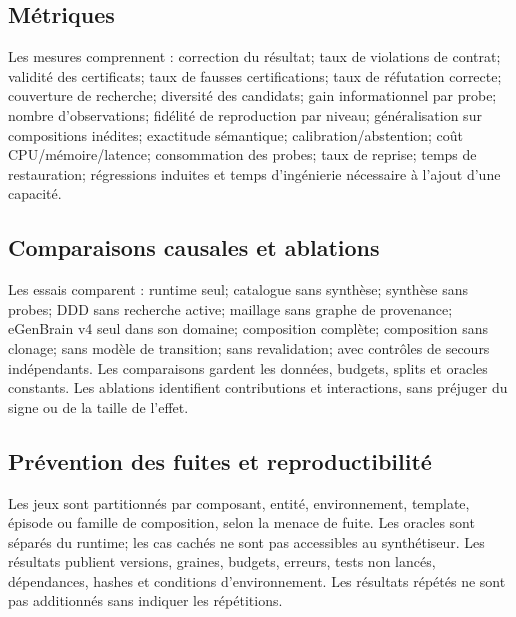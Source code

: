 \documentclass[11pt,a4paper]{article}
\begin{document}
\subsection{Métriques}
Les mesures comprennent : correction du résultat; taux de violations de contrat; validité des certificats; taux de fausses certifications; taux de réfutation correcte; couverture de recherche; diversité des candidats; gain informationnel par probe; nombre d'observations; fidélité de reproduction par niveau; généralisation sur compositions inédites; exactitude sémantique; calibration/abstention; coût CPU/mémoire/latence; consommation des probes; taux de reprise; temps de restauration; régressions induites et temps d'ingénierie nécessaire à l'ajout d'une capacité.

\subsection{Comparaisons causales et ablations}
Les essais comparent : runtime seul; catalogue sans synthèse; synthèse sans probes; DDD sans recherche active; maillage sans graphe de provenance; eGenBrain v4 seul dans son domaine; composition complète; composition sans clonage; sans modèle de transition; sans revalidation; avec contrôles de secours indépendants. Les comparaisons gardent les données, budgets, splits et oracles constants. Les ablations identifient contributions et interactions, sans préjuger du signe ou de la taille de l'effet.

\subsection{Prévention des fuites et reproductibilité}
Les jeux sont partitionnés par composant, entité, environnement, template, épisode ou famille de composition, selon la menace de fuite. Les oracles sont séparés du runtime; les cas cachés ne sont pas accessibles au synthétiseur. Les résultats publient versions, graines, budgets, erreurs, tests non lancés, dépendances, hashes et conditions d'environnement. Les résultats répétés ne sont pas additionnés sans indiquer les répétitions.
\end{document}
